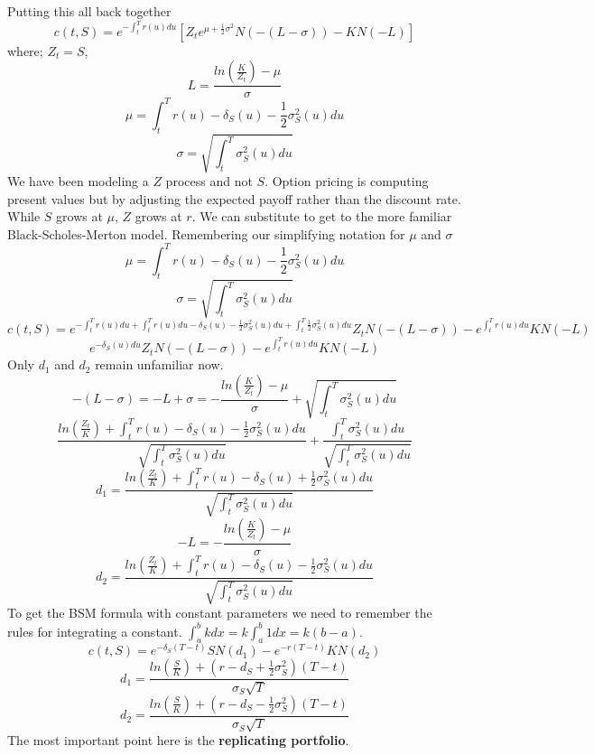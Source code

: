\documentclass[12pt]{article}
\begin{document}
Putting this all back together
\begin{equation}
c(t,S)=e^{-\int_t^Tr(u)du}
\left[ Z_te^{\mu+\frac{1}{2}\sigma^2}N(-(L-\sigma)) -KN(-L) \right]
\end{equation}
where; $Z_t=S$,
$$L=\frac{ln\left(\frac{K}{Z_t}\right)-\mu}{\sigma}$$
$$\mu=\int_t^Tr(u)-\delta_S(u)-\frac{1}{2}\sigma_S^2(u)du$$
$$\sigma=\sqrt{\int_t^T\sigma_S^2(u)du}$$
We have been modeling a $Z$ process and not $S$. Option pricing is computing
present values but by adjusting the expected payoff rather than the discount
rate. While $S$ grows at $\mu$, $Z$ grows at $r$.
We can substitute to get to the more familiar Black-Scholes-Merton model.
Remembering our simplifying notation for $\mu$ and $\sigma$
$$\mu=\int_t^Tr(u)-\delta_S(u)-\frac{1}{2}\sigma_S^2(u)du$$
$$\sigma=\sqrt{\int_t^T\sigma_S^2(u)du}$$
$$c(t,S)=
e^{-\int_t^Tr(u)du+\int_t^Tr(u)du-\delta_S(u)-\frac{1}{2}\sigma_S^2(u)du
  +\int_t^T\frac{1}{2}\sigma_S^2(u)du}
Z_tN(-(L-\sigma))-e^{\int_t^Tr(u)du}KN(-L)$$
\begin{equation} \label{BS}
e^{-\delta_S(u)du}Z_tN(-(L-\sigma))-e^{\int_t^Tr(u)du}KN(-L)
\end{equation}
Only $d_1$ and $d_2$ remain unfamiliar now.
$$-(L-\sigma)=-L+\sigma=-\frac{ln\left(\frac{K}{Z_t}\right)-\mu}{\sigma}+
\sqrt{\int_t^T\sigma_S^2(u)du}$$
$$\frac{ln\left(\frac{Z_t}{K}\right)+
\int_t^Tr(u)-\delta_S(u)-\frac{1}{2}\sigma_S^2(u)du}
{\sqrt{\int_t^T\sigma_S^2(u)du}}+
\frac{\int_t^T\sigma_S^2(u)du}{\sqrt{\int_t^T\sigma_S^2(u)du}}$$
\begin{equation} \label{BSd1}
d_1=\frac{ln\left(\frac{Z_t}{K}\right)+
    \int_t^Tr(u)-\delta_S(u)+\frac{1}{2}\sigma_S^2(u)du}
{\sqrt{\int_t^T\sigma_S^2(u)du}}
\end{equation}
$$-L=-\frac{ln\left(\frac{K}{Z_t}\right)-\mu}{\sigma}$$
\begin{equation} \label{BSd2}
d_2=\frac{ln\left(\frac{Z_t}{K}\right)+
\int_t^Tr(u)-\delta_S(u)-\frac{1}{2}\sigma_S^2(u)du}
{\sqrt{\int_t^T\sigma_S^2(u)du}}
\end{equation}
To get the BSM formula with constant parameters we need to remember the rules
for integrating a constant. $\int_a^bkdx=k\int_a^b1dx=k(b-a)$.
$$c(t,S)=e^{-\delta_S(T-t)}SN(d_1)-e^{-r(T-t)}KN(d_2)$$
$$d_1=\frac{ln\left( \frac{S}{K} \right) +
(r-d_S+\frac{1}{2}\sigma_S^2)(T-t)}{\sigma_S\sqrt{T}}$$
$$d_2=\frac{ln\left( \frac{S}{K} \right) +
    (r-d_S-\frac{1}{2}\sigma_S^2)(T-t)}{\sigma_S\sqrt{T}}$$
The most important point here is the \textbf{replicating portfolio}.
\end{document}
